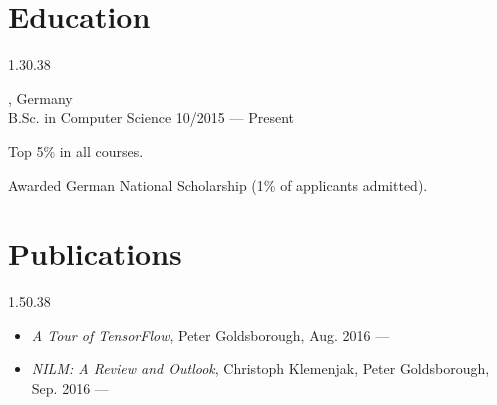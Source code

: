 \section{Education}{1.3}{0.38}
\vspace{0.1cm}
\begin{entry}
	{, Germany}
	{\\B.Sc. in Computer Science}
	{10/2015 --- Present}
  \item Top 5\% in all courses.
  \item Awarded German National Scholarship (1\% of applicants admitted).
\end{entry}

\section{Publications}{1.5}{0.38}
\vspace{-2mm}
\begin{itemize}
  \item \emph{A Tour of TensorFlow}, Peter Goldsborough, Aug. 2016 --- 
  \item \emph{NILM: A Review and Outlook}, Christoph Klemenjak, Peter Goldsborough, Sep. 2016 --- 
\end{itemize}


